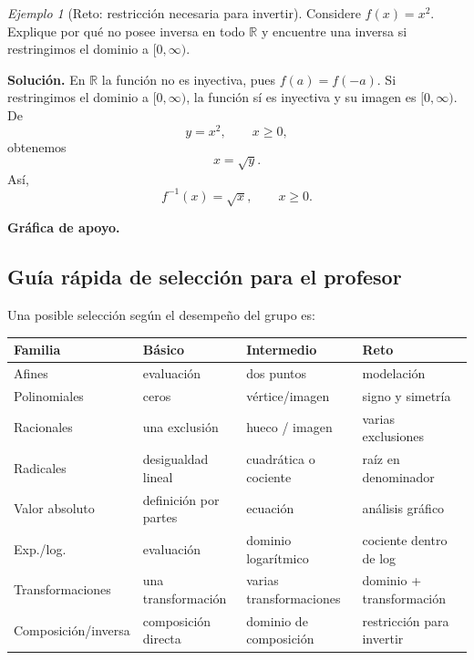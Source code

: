 \documentclass[12pt]{article}
\theoremstyle{remark}
\newtheorem{ejemplo}{Ejemplo}[section]
\newcommand{\R}{\mathbb{R}}
\begin{document}
\begin{ejemplo}[Reto: restricción necesaria para invertir]
Considere $f(x)=x^2$. Explique por qué no posee inversa en todo $\R$ y encuentre una inversa si restringimos el dominio a $[0,\infty)$.

\textbf{Solución.} En $\R$ la función no es inyectiva, pues $f(a)=f(-a)$. Si restringimos el dominio a $[0,\infty)$, la función sí es inyectiva y su imagen es $[0,\infty)$. De
\[
y=x^2,\qquad x\ge0,
\]
obtenemos
\[
x=\sqrt{y}.
\]
Así,
\[
\boxed{f^{-1}(x)=\sqrt{x},\qquad x\ge0}.
\]


\textbf{Gráfica de apoyo.}\medskip
\begin{center}
\end{center}

\end{ejemplo}

\subsection{Guía rápida de selección para el profesor}

Una posible selección según el desempeño del grupo es:
\begin{center}
\begin{tabular}{p{}p{}p{}p{}}
\toprule
\textbf{Familia} & \textbf{Básico} & \textbf{Intermedio} & \textbf{Reto}\\
\midrule
Afines & evaluación & dos puntos & modelación\\
Polinomiales & ceros & vértice/imagen & signo y simetría\\
Racionales & una exclusión & hueco / imagen & varias exclusiones\\
Radicales & desigualdad lineal & cuadrática o cociente & raíz en denominador\\
Valor absoluto & definición por partes & ecuación & análisis gráfico\\
Exp./log. & evaluación & dominio logarítmico & cociente dentro de log\\
Transformaciones & una transformación & varias transformaciones & dominio + transformación\\
Composición/inversa & composición directa & dominio de composición & restricción para invertir\\
\bottomrule
\end{tabular}
\end{center}
\end{document}
